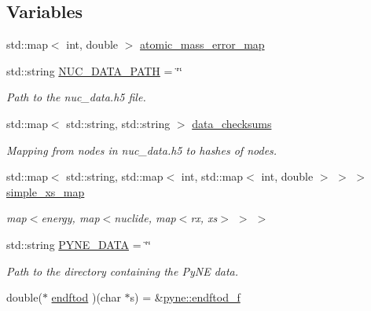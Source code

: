 \subsection*{Variables}
\begin{DoxyCompactItemize}
\item 
std\+::map$<$ int, double $>$ \hyperlink{namespacepyne_a0b5e8bedb1b53fcfac588b21d76ccf58}{atomic\+\_\+mass\+\_\+error\+\_\+map}
\item 
std\+::string \hyperlink{namespacepyne_ac4b3b3dcf295d033b906bf921d820ae2}{N\+U\+C\+\_\+\+D\+A\+T\+A\+\_\+\+P\+A\+TH} = \char`\"{}\char`\"{}\hypertarget{namespacepyne_ac4b3b3dcf295d033b906bf921d820ae2}{}\label{namespacepyne_ac4b3b3dcf295d033b906bf921d820ae2}

\begin{DoxyCompactList}\small\item\em Path to the nuc\+\_\+data.\+h5 file. \end{DoxyCompactList}\item 
std\+::map$<$ std\+::string, std\+::string $>$ \hyperlink{namespacepyne_a092bde815498a51a7532e3021a63ede5}{data\+\_\+checksums}
\begin{DoxyCompactList}\small\item\em Mapping from nodes in nuc\+\_\+data.\+h5 to hashes of nodes. \end{DoxyCompactList}\item 
std\+::map$<$ std\+::string, std\+::map$<$ int, std\+::map$<$ int, double $>$ $>$ $>$ \hyperlink{namespacepyne_a75b3d385906d5d2f078a6d099629a5c8}{simple\+\_\+xs\+\_\+map}\hypertarget{namespacepyne_a75b3d385906d5d2f078a6d099629a5c8}{}\label{namespacepyne_a75b3d385906d5d2f078a6d099629a5c8}

\begin{DoxyCompactList}\small\item\em map$<$energy, map$<$nuclide, map$<$rx, xs$>$ $>$ $>$ \end{DoxyCompactList}\item 
std\+::string \hyperlink{namespacepyne_a7927bda45ba222dccef6e43a373b76a6}{P\+Y\+N\+E\+\_\+\+D\+A\+TA} = \char`\"{}\char`\"{}\hypertarget{namespacepyne_a7927bda45ba222dccef6e43a373b76a6}{}\label{namespacepyne_a7927bda45ba222dccef6e43a373b76a6}

\begin{DoxyCompactList}\small\item\em Path to the directory containing the Py\+NE data. \end{DoxyCompactList}\item 
double($\ast$ \hyperlink{namespacepyne_aa938a7defc049d691fa6d84aa2c1931e}{endftod} )(char $\ast$s) = \&\hyperlink{namespacepyne_a14e300f1e589b42aaa451bc3cf4c70b8}{pyne\+::endftod\+\_\+f}\hypertarget{namespacepyne_aa938a7defc049d691fa6d84aa2c1931e}{}\label{namespacepyne_aa938a7defc049d691fa6d84aa2c1931e}


\end{DoxyCompactItemize}
